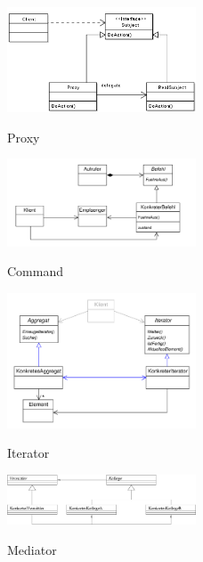 \begin{figure}[h]
	\begin{center}
		\includegraphics[width=0.5\textwidth]{images/proxy}
		\label{fig:proxy}
		\caption{Proxy}
	\end{center}
\end{figure}

\begin{figure}[h]
	\begin{center}
		\includegraphics[width=0.5\textwidth]{images/command}
		\label{fig:command}
		\caption{Command}
	\end{center}
\end{figure}

\begin{figure}[h]
	\begin{center}
		\includegraphics[width=0.5\textwidth]{images/iterator}
		\label{fig:iterator}
		\caption{Iterator}
	\end{center}
\end{figure}

\begin{figure}[h]
	\begin{center}
		\includegraphics[width=0.5\textwidth]{images/mediator}
		\label{fig:mediator}
		\caption{Mediator}
	\end{center}
\end{figure}

